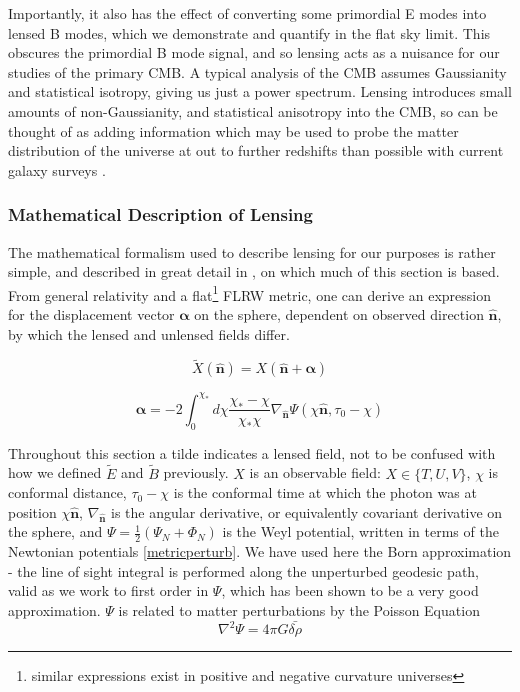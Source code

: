 \documentclass[a4paper,10pt]{article}
\renewcommand{\v}[1]{\mathbf{#1}}
\newcommand{\half}{\frac{1}{2}}
\newcommand{\unit}[1]{\hat{\v{#1}}}
\begin{document}
Importantly, it also has the effect of converting some primordial E modes into lensed B modes, which we demonstrate and quantify in the flat sky limit. This obscures the primordial B mode signal, and so lensing acts as a nuisance for our studies of the primary CMB.  A typical analysis of the CMB assumes Gaussianity and statistical isotropy, giving us just a power spectrum. Lensing introduces small amounts of non-Gaussianity, and statistical anisotropy into the CMB, so can be thought of as adding information which may be used to probe the matter distribution of the universe at out to further redshifts than possible with current galaxy surveys \cite{sloan}.

\subsubsection{Mathematical Description of Lensing}

The mathematical formalism used to describe lensing for our purposes is rather simple, and described in great detail in \cite{lewis}, on which much of this section is based. From general relativity and a flat\footnote{similar expressions exist in positive and negative curvature universes} FLRW metric, one can derive an expression for the displacement vector $\v{\alpha}$ on the sphere, dependent on observed direction $\unit{n}$, by which the lensed and unlensed fields differ. 

\begin{equation}
\tilde{X}(\unit{n}) = X(\unit{n}+\v{\alpha})
\end{equation}

\begin{equation}
\v{\alpha} = -2 \int_0^{\chi_*}d\chi \frac{\chi_*-\chi}{\chi_*\chi}\nabla_{\unit{n}}\Psi(\chi\unit{n},\tau_0-\chi)
\end{equation}

Throughout this section a tilde indicates a lensed field, not to be confused with how we defined $\tilde{E}$ and $\tilde{B}$ previously. $X$ is an observable field: $X \in \{ T, U, V\}$, $\chi$ is conformal distance, $\tau_0-\chi$ is the conformal time at which the photon was at position $\chi\unit{n}$, $\nabla_{\unit{n}}$ is the angular derivative, or equivalently covariant derivative on the sphere, and $\Psi=\half(\Psi_N+\Phi_N)$ is the Weyl potential, written in terms of the Newtonian potentials \ref{metricperturb}. We have used here the Born approximation - the line of sight integral is performed along the unperturbed geodesic path, valid as we work to first order in $\Psi$, which has been shown to be a very good approximation. $\Psi$ is related to matter perturbations by the Poisson Equation
\begin{equation}
\nabla^2\Psi = 4\pi G\bar{\delta\rho}
\label{poisson}
\end{equation}
\end{document}
